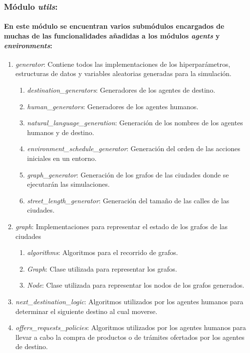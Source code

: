 \documentclass[12pt]{amsart}
\begin{document}
\subsubsection{Módulo \textit{utils}:}

\paragraph{En este módulo se encuentran varios submódulos encargados de muchas de las funcionalidades añadidas a los módulos \textit{agents} y \textit{environments}: }

		\begin{enumerate}
			\item \textit{generator}: Contiene todos las implementaciones de los hiperparámetros, estructuras de datos y variables aleatorias generadas para la simulación.
			\begin {enumerate}
				\item {\textit{destination\_generators}: Generadores de los agentes de destino.}
				\item {\textit{human\_generators}: Generadores de los agentes humanos.}
				\item {\textit{natural\_language\_generation}: Generación de los nombres de los agentes humanos y de destino.}
				\item {\textit{environment\_schedule\_generator}: Generación del orden de las acciones iniciales en un entorno.}
				\item {\textit{graph\_generator}: Generación de los grafos de las ciudades donde se ejecutarán las simulaciones.}
				\item {\textit{street\_length\_generator}: Generación del tamaño de las calles de las ciudades.}
			\end {enumerate}
			\item \textit{graph}: Implementaciones para representar el estado de los grafos de las ciudades
			\begin {enumerate}
				\item {\textit{algorithms}: Algoritmos para el recorrido de grafos.}
				\item {\textit{Graph}: Clase utilizada para representar los grafos.}
				\item {\textit{Node}: Clase utilizada para representar los nodos de los grafos generados.}
			\end {enumerate}
			\item \textit{next\_destination\_logic}: Algoritmos utilizados por los agentes humanos para determinar el siguiente destino al cual moverse.
			\item \textit{offers\_requests\_policies}: Algoritmos utilizados por los agentes humanos para llevar a cabo la compra de productos o de trámites ofertados por los agentes de destino.

		\end{enumerate}
\end{document}
